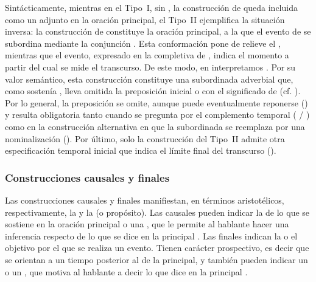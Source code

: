 \begin{recuadro}
Sintácticamente, mientras en el Tipo~I, sin , la construcción de
 queda incluida como un adjunto en la oración principal, el Tipo~II
ejemplifica la situación inversa: la construcción de 
constituye la oración principal, a la que el evento de  se subordina mediante la conjunción . Esta conformación
pone de relieve el , mientras que el evento, expresado en la
completiva de , indica el momento a partir del cual se mide el
transcurso. De este modo, en  interpretamos . Por su valor semántico, esta
construcción constituye una subordinada adverbial que, como sostenía
\textcite[§\,778]{bello2002}, lleva omitida la preposición inicial  o
 con el significado de  (cf. ). Por lo general, la preposición se omite, aunque
puede eventualmente reponerse () y resulta obligatoria tanto cuando se pregunta por el complemento
temporal ( / ) como en la construcción alternativa en que la subordinada se reemplaza
por una nominalización (). Por último, solo la
construcción del Tipo~II admite otra especificación temporal inicial que indica
el límite final del transcurso ().
\end{recuadro}

\subsubsection{Construcciones causales y finales}\label{sec:13-causales}

Las construcciones causales y finales manifiestan, en términos aristotélicos,
respectivamente, la  y la  (o propósito).
Las causales pueden indicar la  de lo que se sostiene en la
oración principal  o una , que
le permite al hablante hacer una inferencia respecto de lo que se dice en la
principal . Las finales indican la  o el
objetivo por el que se realiza un evento. Tienen carácter prospectivo, es decir
que se orientan a un tiempo posterior al de la principal, y también pueden
indicar un   o un , que motiva al hablante a decir lo que dice en la principal
.

